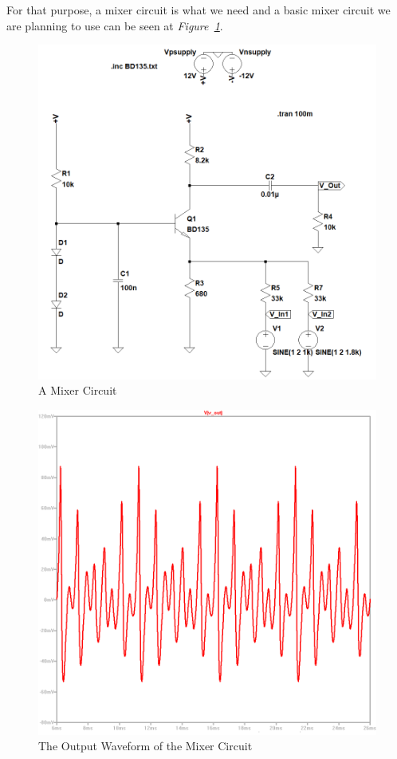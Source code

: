 \documentclass[paper]{IEEEtran}
\begin{document}
	
	For that purpose, a mixer circuit is what we need and a basic mixer circuit we are planning to use can be seen at \textit{Figure~\ref{fig:mixer}}.
	
\begin{figure}[h!]
\setlength{\unitlength}{\textwidth}
\center 
\includegraphics[width=0.45\unitlength]{mixer_v2_2.png}
\caption{\label{fig:mixer}A Mixer Circuit }
\end{figure}	

\begin{figure}[h!]
\setlength{\unitlength}{\textwidth}
\center 
\includegraphics[width=0.45\unitlength]{mixer_op3.png}
\caption{\label{fig:mixervo} The Output Waveform of the Mixer Circuit }
\end{figure}	
\end{document}

